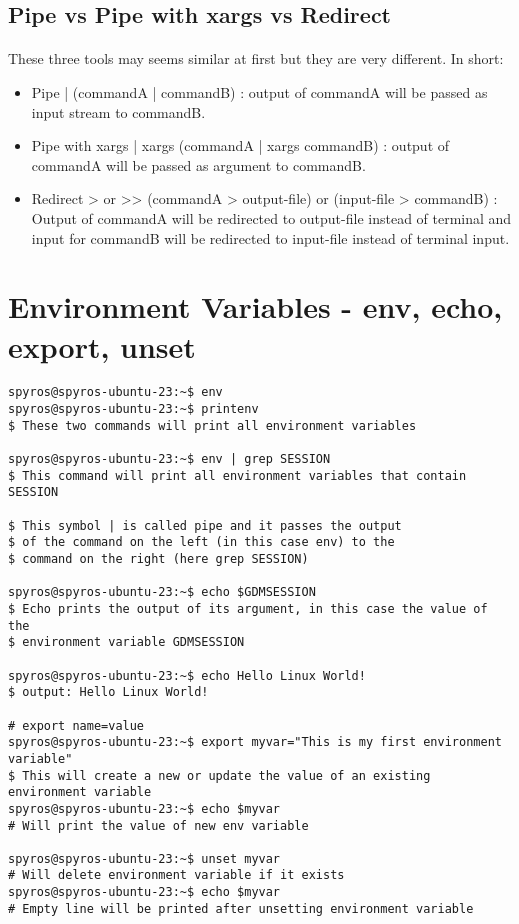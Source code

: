 \documentclass{article}
\begin{document}
\subsection{Pipe vs Pipe with xargs vs Redirect}
\paragraph{} These three tools may seems similar at first but they are very different. In short:\\
\begin{itemize}
	\item Pipe | (commandA | commandB) :  output of commandA will be passed as input stream to commandB.
	\item Pipe with xargs | xargs (commandA | xargs commandB) : output of commandA will be passed as argument to commandB.
	\item Redirect > or >{}> (commandA > output-file) or (input-file > commandB) : Output of commandA will be redirected to output-file instead of terminal and input for commandB will be redirected to input-file instead of terminal input.
\end{itemize}

\section{Environment Variables - env, echo, export, unset}
\begin{lstlisting}
spyros@spyros-ubuntu-23:~$ env
spyros@spyros-ubuntu-23:~$ printenv
$ These two commands will print all environment variables

spyros@spyros-ubuntu-23:~$ env | grep SESSION
$ This command will print all environment variables that contain SESSION

$ This symbol | is called pipe and it passes the output
$ of the command on the left (in this case env) to the
$ command on the right (here grep SESSION)

spyros@spyros-ubuntu-23:~$ echo $GDMSESSION
$ Echo prints the output of its argument, in this case the value of the
$ environment variable GDMSESSION

spyros@spyros-ubuntu-23:~$ echo Hello Linux World!
$ output: Hello Linux World!

# export name=value
spyros@spyros-ubuntu-23:~$ export myvar="This is my first environment variable"
$ This will create a new or update the value of an existing environment variable
spyros@spyros-ubuntu-23:~$ echo $myvar
# Will print the value of new env variable

spyros@spyros-ubuntu-23:~$ unset myvar
# Will delete environment variable if it exists
spyros@spyros-ubuntu-23:~$ echo $myvar
# Empty line will be printed after unsetting environment variable

\end{lstlisting}
\end{document}
